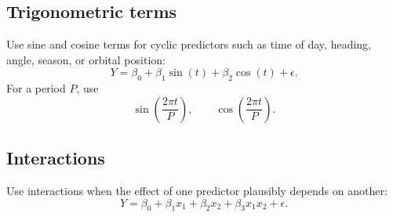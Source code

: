 \subsection*{Trigonometric terms}

Use sine and cosine terms for cyclic predictors such as time of day, heading, angle, season, or orbital position:
\begin{equation}
  Y=\beta_0+\beta_1\sin(t)+\beta_2\cos(t)+\epsilon.
\end{equation}
For a period \(P\), use
\begin{equation}
  \sin\left(\frac{2\pi t}{P}\right),
  \qquad
  \cos\left(\frac{2\pi t}{P}\right).
\end{equation}

\subsection*{Interactions}

Use interactions when the effect of one predictor plausibly depends on another:
\begin{equation}
  Y=\beta_0+\beta_1x_1+\beta_2x_2+\beta_3x_1x_2+\epsilon.
\end{equation}


